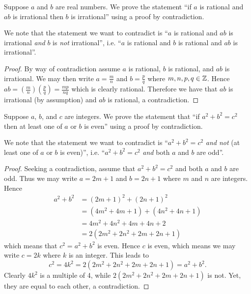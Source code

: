 \begin{example}
    Suppose $a$ and $b$ are real numbers. We prove the statement ``if $a$ is rational and $ab$ is irrational then $b$ is irrational'' using a proof by contradiction.

    We note that the statement we want to contradict is ``$a$ is rational and $ab$ is irrational \textit{and} $b$ is \textit{not} irrational'', i.e. ``$a$ is rational and $b$ is rational and $ab$ is irrational''.
    \begin{proof}
        By way of contradiction assume $a$ is rational, $b$ is rational, and $ab$ is irrational. We may then write $a = \frac mn$ and $b = \frac pq$ where $m, n, p, q \in \mathbb{Z}$. Hence $ab = \left(\frac mn\right)\left(\frac pq\right) = \frac{mp}{nq}$ which is clearly rational. Therefore we have that $ab$ is irrational (by assumption) and $ab$ is rational, a contradiction.
    \end{proof}
\end{example}

\begin{example}
    Suppose $a$, $b$, and $c$ are integers. We prove the statement that ``if $a^2 + b^2 = c^2$ then at least one of $a$ or $b$ is even'' using a proof by contradiction.

    We note that the statement we want to contradict is ``$a^2 + b^2 = c^2$ \textit{and not} (at least one of $a$ or $b$ is even)'', i.e. ``$a^2 + b^2 = c^2$ \textit{and} both $a$ and $b$ are odd''.
    \begin{proof}
        Seeking a contradiction, assume that $a^2 + b^2 = c^2$ and both $a$ and $b$ are odd. Thus we may write $a = 2m + 1$ and $b = 2n + 1$ where $m$ and $n$ are integers. Hence
        \begin{align*}
            a^2 + b^2 &= (2m+1)^2 + (2n+1)^2\\
            &= (4m^2+4m+1) + (4n^2+4n+1)\\
            &= 4m^2 + 4n^2 + 4m + 4n + 2\\
            &= 2(2m^2 + 2n^2 + 2m + 2n +1)
        \end{align*}
        which means that $c^2 = a^2 + b^2$ is even. Hence $c$ is even, which means we may write $c = 2k$ where $k$ is an integer. This leads to
        \[
            c^2 = 4k^2 = 2(2m^2 + 2n^2 + 2m + 2n + 1) = a^2 + b^2.
        \]
        Clearly $4k^2$ is a multiple of 4, while $2(2m^2 + 2n^2 + 2m + 2n + 1)$ is not. Yet, they are equal to each other, a contradiction.
    \end{proof}
\end{example}


